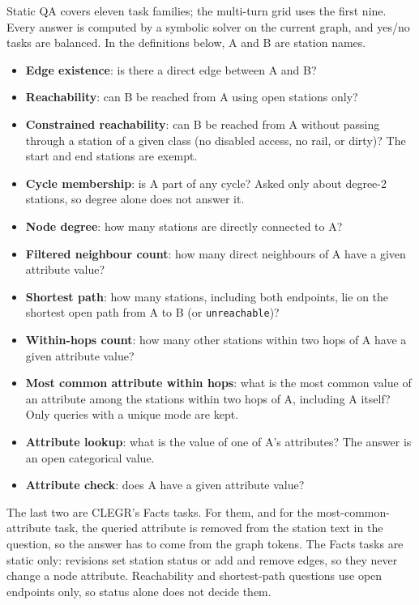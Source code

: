 \documentclass[11pt]{article}
\begin{document}
Static QA covers eleven task families; the multi-turn grid uses the first nine.
Every answer is computed by a symbolic solver on the current graph, and yes/no tasks are balanced.
In the definitions below, A and B are station names.
\begin{itemize}[itemsep=1pt]
  \item \textbf{Edge existence}: is there a direct edge between A and B?
  \item \textbf{Reachability}: can B be reached from A using open stations only?
  \item \textbf{Constrained reachability}: can B be reached from A without passing through a station of a given class (no disabled access, no rail, or dirty)? The start and end stations are exempt.
  \item \textbf{Cycle membership}: is A part of any cycle? Asked only about degree-2 stations, so degree alone does not answer it.
  \item \textbf{Node degree}: how many stations are directly connected to A?
  \item \textbf{Filtered neighbour count}: how many direct neighbours of A have a given attribute value?
  \item \textbf{Shortest path}: how many stations, including both endpoints, lie on the shortest open path from A to B (or \texttt{unreachable})?
  \item \textbf{Within-hops count}: how many other stations within two hops of A have a given attribute value?
  \item \textbf{Most common attribute within hops}: what is the most common value of an attribute among the stations within two hops of A, including A itself? Only queries with a unique mode are kept.
  \item \textbf{Attribute lookup}: what is the value of one of A's attributes? The answer is an open categorical value.
  \item \textbf{Attribute check}: does A have a given attribute value?
\end{itemize}
The last two are CLEGR's Facts tasks.
For them, and for the most-common-attribute task, the queried attribute is removed from the station text in the question, so the answer has to come from the graph tokens.
The Facts tasks are static only: revisions set station status or add and remove edges, so they never change a node attribute.
Reachability and shortest-path questions use open endpoints only, so status alone does not decide them.
\end{document}
